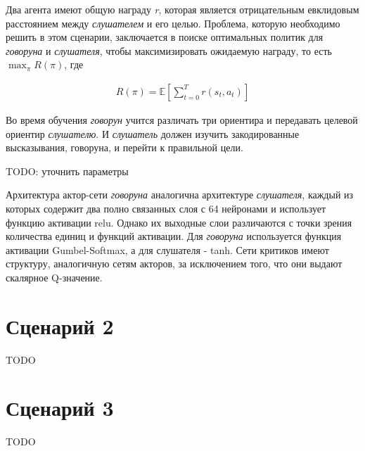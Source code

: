 Два агента имеют общую награду \textit{r}, которая является отрицательным евклидовым расстоянием между \textit{слушателем} и его целью. Проблема, которую необходимо решить в этом сценарии, заключается в поиске оптимальных политик для \textit{говоруна} и \textit{слушателя}, чтобы максимизировать ожидаемую награду, то есть $\max_{\pi}R(\pi)$, где

\begin{equation}
    \begin{multlined}
        R(\pi) = \mathbb{E}[\sum_{t=0}^{T}r(s_t, a_t)]
    \end{multlined}
\end{equation}

Во время обучения \textit{говорун} учится различать три ориентира и передавать целевой ориентир \textit{слушателю}. И \textit{слушатель} должен изучить закодированные высказывания, говоруна, и перейти к правильной цели.

TODO: уточнить параметры

Архитектура актор-сети \textit{говоруна} аналогична архитектуре \textit{слушателя}, каждый из которых содержит два полно связанных слоя с 64 нейронами и использует функцию активации relu. Однако их выходные слои различаются с точки зрения количества единиц и функций активации. Для \textit{говоруна} используется функция активации Gumbel-Softmax, а для слушателя - tanh. Сети критиков имеют структуру, аналогичную сетям акторов, за исключением того, что они выдают скалярное Q-значение.


\section{Сценарий 2}

TODO


\section{Сценарий 3}

TODO

\newpage
